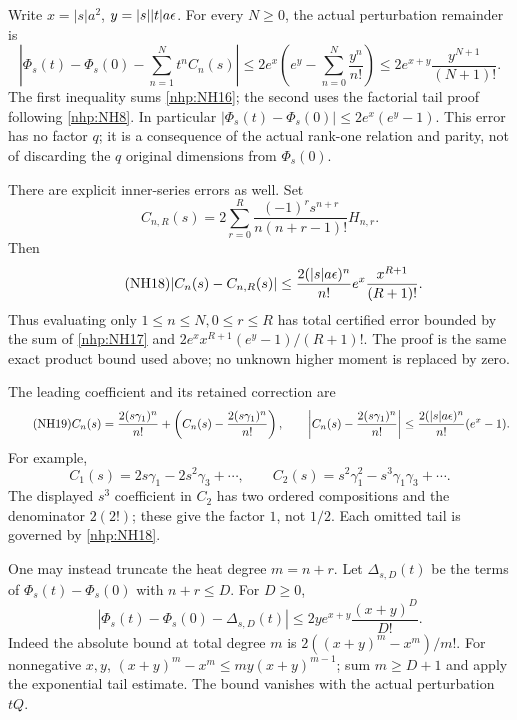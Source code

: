 \documentclass[11pt]{article}
\begin{document}
Write \(x=|s|a^2\), \(y=|s||t|a\epsilon\).
For every \(N\ge0\), the actual perturbation remainder is
\begin{equation}\tag{NH17}\label{nhp:NH17}
\left|\Phi_s(t)-\Phi_s(0)-\sum_{n=1}^N t^n C_n(s)\right|
\le 2e^x\left(e^y-\sum_{n=0}^N\frac{y^n}{n!}\right)
\le2e^{x+y}\frac{y^{N+1}}{(N+1)!}.
\end{equation}
The first inequality sums \eqref{nhp:NH16}; the second
uses the factorial tail proof following \eqref{nhp:NH8}.
In particular
\(|\Phi_s(t)-\Phi_s(0)|\le2e^x(e^y-1)\).
This error has no factor \(q\); it is a consequence of
the actual rank-one relation and parity, not of discarding
the \(q\) original dimensions from \(\Phi_s(0)\).

There are explicit inner-series errors as well. Set
\[
C_{n,R}(s)=2\sum_{r=0}^{R}
\frac{(-1)^rs^{n+r}}{n(n+r-1)!}H_{n,r}.
\]
Then
\begin{equation}\tag{NH18}\label{nhp:NH18}
|C_n(s)-C_{n,R}(s)|
\le\frac{2(|s|a\epsilon)^n}{n!}
e^x\frac{x^{R+1}}{(R+1)!}.
\end{equation}
Thus evaluating only \(1\le n\le N,0\le r\le R\)
has total certified error bounded by the sum of
\eqref{nhp:NH17} and
\(2e^x x^{R+1}(e^y-1)/(R+1)!\).
The proof is the same exact product bound used above;
no unknown higher moment is replaced by zero.

The leading coefficient and its retained correction are
\begin{equation}\tag{NH19}\label{nhp:NH19}
C_n(s)=\frac{2(s\gamma_1)^n}{n!}
+\left(C_n(s)-\frac{2(s\gamma_1)^n}{n!}\right),\qquad
\left|C_n(s)-\frac{2(s\gamma_1)^n}{n!}\right|
\le\frac{2(|s|a\epsilon)^n}{n!}(e^x-1).
\end{equation}
For example,
\begin{equation}\tag{NH20}\label{nhp:NH20}
C_1(s)=2s\gamma_1-2s^2\gamma_3+\cdots,\qquad
C_2(s)=s^2\gamma_1^2-s^3\gamma_1\gamma_3+\cdots .
\end{equation}
The displayed \(s^3\) coefficient in \(C_2\) has two
ordered compositions and the denominator \(2(2!)\);
these give the factor \(1\), not \(1/2\).
Each omitted tail is governed by \eqref{nhp:NH18}.

One may instead truncate the heat degree \(m=n+r\).
Let \(\Delta_{s,D}(t)\) be the terms of
\(\Phi_s(t)-\Phi_s(0)\) with \(n+r\le D\).
For \(D\ge0\),
\begin{equation}\tag{NH21}\label{nhp:NH21}
|\Phi_s(t)-\Phi_s(0)-\Delta_{s,D}(t)|
\le 2y e^{x+y}\frac{(x+y)^D}{D!}.
\end{equation}
Indeed the absolute bound at total degree \(m\) is
\(2((x+y)^m-x^m)/m!\).
For nonnegative \(x,y\),
\((x+y)^m-x^m\le my(x+y)^{m-1}\);
sum \(m\ge D+1\) and apply the exponential tail estimate.
The bound vanishes with the actual perturbation \(tQ\).
\end{document}
